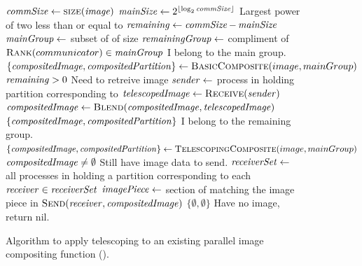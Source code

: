 \documentclass{acm_proc_article-sp}
\begin{document}
\begin{figure}
  \begin{codebox}
    \li $\id{commSize} \leftarrow \proc{size}(\id{image})$
    \li $\id{mainSize} \leftarrow 2^{\lfloor \log_{2} \id{commSize} \rfloor}$
        \Comment Largest power of two less than or equal to 
    \li $\id{remaining} \leftarrow \id{commSize} - \id{mainSize}$
    \li $\id{mainGroup} \leftarrow$ subset of  of size 
    \li $\id{remainingGroup} \leftarrow$ compliment of 
    \li \If $\proc{Rank}(communicator) \in \id{mainGroup}$
    \zi \Then \Comment I belong to the main group.
    \li       $\{ \id{compositedImage}, \id{compositedPartition} \} \leftarrow \proc{BasicComposite}(image, mainGroup)$
    \li       \If $\id{remaining} > 0$
    \zi       \Then \Comment Need to retreive image
    \li             $\id{sender} \leftarrow$ process in  holding partition corresponding to 
    \label{line:SenderIndexMagic}
    \li             $\id{telescopedImage} \leftarrow \proc{Receive}(\id{sender})$
    \li             $\id{compositedImage} \leftarrow \proc{Blend}(\id{compositedImage}, \id{telescopedImage})$
              \End
    \li       \Return $\{ \id{compositedImage}, \id{compositedPartition} \}$
    \zi \Else \Comment I belong to the remaining group.
    \li       $\{ \id{compositedImage}, \id{compositedPartition} \} \leftarrow \proc{TelescopingComposite}(image, mainGroup)$
    \li       \If $\id{compositedImage} \neq \emptyset$
    \zi       \Then \Comment Still have image data to send.
    \li             $\id{receiverSet} \leftarrow$ all processes in  holding a partition corresponding to 
    \label{line:ReceiverIndexMagic}
    \li             \For each $\id{receiver} \in \id{receiverSet}$
    \zi             \Do
    \li                  $\id{imagePiece} \leftarrow$ section of  matching the image piece in 
    \li                  $\proc{Send}(\id{receiver}, \id{compositedImage})$
                    \End
              \End
    \li       \Return $\{ \emptyset, \emptyset \}$ \Comment Have no image, return nil.
        \End
  \end{codebox}
  \vspace*{-18pt}
  \caption{Algorithm to apply telescoping to an existing parallel image
    compositing function ().}
  \label{fig:TelescopingComposite}
\end{figure}
\end{document}
